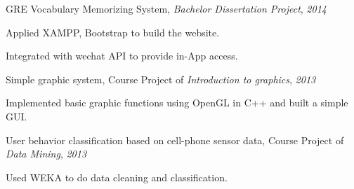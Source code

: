 \documentclass{res}
\newcommand{\parsp}{\vspace{-0.7\baselineskip}}
\newcommand{\additemindent}{\addtolength{\itemindent}{1em}}
\begin{document}
\begin{resume}
\begin{asparaenum}
	\item GRE Vocabulary Memorizing System, \emph{Bachelor Dissertation Project}, \hfill \emph{2014}
		\begin{asparaitem}
			\additemindent
			\item Applied XAMPP, Bootstrap to build the website.
			\item Integrated with wechat API to provide in-App access.
		\end{asparaitem}

	\item Simple graphic system, Course Project of \emph{Introduction to graphics}, \hfill \emph{2013}
		\begin{asparaitem}
			\additemindent
			\item Implemented basic graphic functions using OpenGL in C++ and built a simple GUI. 
		\end{asparaitem}

	
 	\item User behavior classification based on cell-phone sensor data, Course Project of \emph{Data Mining}, \hfill \emph{2013}
 		\begin{asparaitem}
			\additemindent
			\item Used WEKA to do data cleaning and classification. 
		\end{asparaitem}

\end{asparaenum}






\end{resume}
\end{document}
